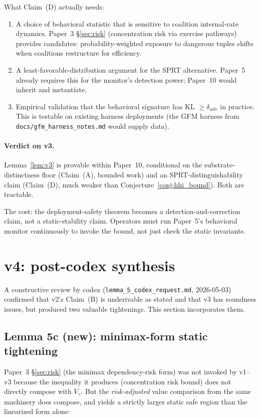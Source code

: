 \documentclass{article}
\begin{document}
What Claim~(D) actually needs:
\begin{enumerate}
\item A choice of behavioral statistic that is sensitive to coalition
  internal-rate dynamics.  Paper~3 \S\ref{sec:risk} (concentration risk
  via exercise pathways) provides candidates: probability-weighted
  exposure to dangerous tuples shifts when coalitions restructure for
  efficiency.
\item A least-favorable-distribution argument for the SPRT
  alternative.  Paper~5 already requires this for the monitor's
  detection power; Paper~10 would inherit and instantiate.
\item Empirical validation that the behavioral signature has KL
  $\geq \delta_{\mathrm{adv}}$ in practice.  This is testable on
  existing harness deployments (the GFM harness from
  \texttt{docs/gfm\_harness\_notes.md} would supply data).
\end{enumerate}

\paragraph{Verdict on v3.}
Lemma~\ref{lem:v3} is provable within Paper~10, conditional on the
substrate-distinctness floor (Claim~(A), bounded work) and an
SPRT-distinguishability claim (Claim~(D), much weaker than
Conjecture~\ref{conj:hhi_bound}).  Both are tractable.

The cost: the deployment-safety theorem becomes a
detection-and-correction claim, not a static-stability claim.  Operators
must run Paper~5's behavioral monitor continuously to invoke the bound,
not just check the static invariants.

\section{v4: post-codex synthesis}

A constructive review by codex (\texttt{lemma\_5\_codex\_request.md},
2026-05-03) confirmed that v2's Claim~(B) is underivable as stated and
that v3 has soundness issues, but produced two valuable tightenings.
This section incorporates them.

\subsection{Lemma 5c (new): minimax-form static tightening}

Paper~3 \S\ref{sec:risk} (the minimax dependency-risk form) was not
invoked by v1--v3 because the inequality it produces (concentration risk
bound) does not directly compose with $V_\gamma$.  But the
\emph{risk-adjusted} value comparison from the same machinery does
compose, and yields a strictly larger static safe region than the
linearized form alone:
\end{document}

